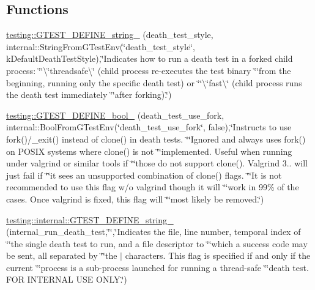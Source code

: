 \subsection*{Functions}
\begin{DoxyCompactItemize}
\item 
\hyperlink{namespacetesting_ad93c9ec89517d047ed323b79d96df251}{testing\+::\+G\+T\+E\+S\+T\+\_\+\+D\+E\+F\+I\+N\+E\+\_\+string\+\_\+} (death\+\_\+test\+\_\+style, internal\+::\+String\+From\+G\+Test\+Env(\char`\"{}death\+\_\+test\+\_\+style\char`\"{}, k\+Default\+Death\+Test\+Style),\char`\"{}Indicates how to run a death test in a forked child process\+: \char`\"{}\char`\"{}\textbackslash{}\char`\"{}threadsafe\textbackslash{}\char`\"{} (child process re-\/executes the test binary \char`\"{}\char`\"{}from the beginning, running only the specific death test) or \char`\"{}\char`\"{}\textbackslash{}\char`\"{}fast\textbackslash{}\char`\"{} (child process runs the death test immediately \char`\"{}\char`\"{}after forking).\char`\"{})
\item 
\hyperlink{namespacetesting_afee59458b05682d57d3a389e0903bc01}{testing\+::\+G\+T\+E\+S\+T\+\_\+\+D\+E\+F\+I\+N\+E\+\_\+bool\+\_\+} (death\+\_\+test\+\_\+use\+\_\+fork, internal\+::\+Bool\+From\+G\+Test\+Env(\char`\"{}death\+\_\+test\+\_\+use\+\_\+fork\char`\"{}, false),\char`\"{}Instructs to use fork()/\+\_\+exit() instead of clone() in death tests. \char`\"{}\char`\"{}Ignored and always uses fork() on P\+O\+S\+I\+X systems where clone() is not \char`\"{}\char`\"{}implemented. Useful when running under valgrind or similar tools if \char`\"{}\char`\"{}those do not support clone(). Valgrind 3.. will just fail if \char`\"{}\char`\"{}it sees an unsupported combination of clone() flags. \char`\"{}\char`\"{}It is not recommended to use this flag w/o valgrind though it will \char`\"{}\char`\"{}work in 99\% of the cases. Once valgrind is fixed, this flag will \char`\"{}\char`\"{}most likely be removed.\char`\"{})
\item 
\hyperlink{namespacetesting_1_1internal_a1b4d550272b7346726a5b4976d5c7aca}{testing\+::internal\+::\+G\+T\+E\+S\+T\+\_\+\+D\+E\+F\+I\+N\+E\+\_\+string\+\_\+} (internal\+\_\+run\+\_\+death\+\_\+test,\char`\"{}\char`\"{},\char`\"{}Indicates the file, line number, temporal index of \char`\"{}\char`\"{}the single death test to run, and a file descriptor to \char`\"{}\char`\"{}which a success code may be sent, all separated by \char`\"{}\char`\"{}the \textquotesingle{}$\vert$\textquotesingle{} characters.  This flag is specified if and only if the current \char`\"{}\char`\"{}process is a sub-\/process launched for running a thread-\/safe \char`\"{}\char`\"{}death test.  F\+O\+R I\+N\+T\+E\+R\+N\+A\+L U\+S\+E O\+N\+L\+Y.\char`\"{})
\end{DoxyCompactItemize}


